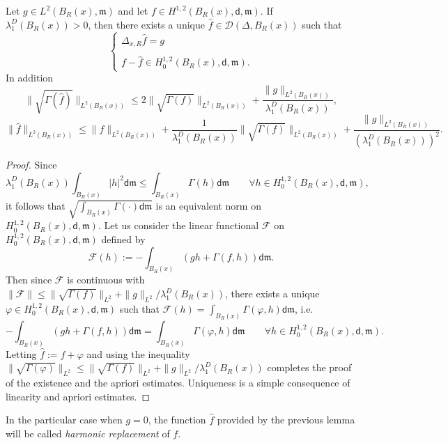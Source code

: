 \documentclass[a4paper,11pt,reqno]{article}
\numberwithin{equation}{section}
\theoremstyle{plain}
\theoremstyle{definition}
\theoremstyle{remark}
\let\altphi\phi
\let\phi\varphi
\let\varphi\altphi
\let\altphi\undefined
\newcommand{\dist}{\mathsf{d}}
\newcommand{\meas}{\mathfrak{m}}
\begin{document}
{\begin{lemma}\label{lem:existence}
Let $g \in L^2(B_R(x), \meas)$ and let $f \in H^{1, 2}(B_R(x), \dist, \meas)$.
If $\lambda_1^D(B_R(x))>0$, then there exists a unique $\hat{f} \in \mathcal{D}(\Delta, B_R(x))$ such that 
\begin{equation}
\begin{cases}
\Delta_{x,R}\hat{f}=g\\\\
f-\hat{f} \in H^{1, 2}_0(B_R(x), \dist, \meas).
\end{cases} 
\end{equation}
In addition
\begin{equation}
\label{eq:sol bound}
\|\sqrt{\Gamma(\hat{f})}\|_{L^2(B_R(x))}\leq 2\|\sqrt{\Gamma(f)}\|_{L^2(B_R(x))}+\frac{\|g\|_{L^2(B_R(x))}}{\lambda_1^D(B_R(x))},
\end{equation}
\begin{equation}\label{eq:l2 est}
\|\hat f\|_{L^2(B_R(x))}\leq \|f\|_{L^2(B_R(x))}+\frac{1}{\lambda_1^D(B_R(x))}\|\sqrt{\Gamma(f)}\|_{L^2(B_R(x))}+
\frac{\|g\|_{L^2(B_R(x))}}{(\lambda_1^D(B_R(x)))^2}.
\end{equation}
\end{lemma}
\begin{proof} Since 
$$
\lambda_1^D(B_R(x))\int_{B_R(x)}|h|^2\dist \meas \le \int_{B_R(x)}\Gamma(h)\dist \meas\qquad\forall h \in H^{1, 2}_0(B_R(x), \dist, \meas),
$$
it follows that $\sqrt{\int_{B_R(x)}\Gamma(\cdot ) \dist \meas}$ is an equivalent norm on $H^{1, 2}_0(B_R(x), \dist, \meas)$.
Let us consider the linear functional $\mathcal{F}$ on $H^{1, 2}_0(B_R(x), \dist, \meas)$ defined by
$$
\mathcal{F}(h):=-\int_{B_R(x)}(gh +\Gamma(f,h)) \dist \meas.
$$
Then since $\mathcal{F}$ is continuous with $\|\mathcal F\|\leq \|\sqrt{\Gamma(f)}\|_{L^2}+\|g\|_{L^2}/\lambda_1^D(B_R(x))$, 
there exists a unique $\phi \in H^{1, 2}_0(B_R(x), \dist, \meas)$ such that $\mathcal{F}(h)=\int_{B_R(x)}\Gamma( \phi,  h) \dist \meas$, i.e.
$$
-\int_{B_R(x)}(gh +\Gamma( f, h ))\dist \meas=\int_{B_R(x)}\Gamma( \phi,  h ) \dist \meas
\qquad \forall h \in H^{1, 2}_0(B_R(x), \dist, \meas).
$$
Letting $\hat{f}:=f+\phi$ and using the inequality $\|\sqrt{\Gamma(\phi)}\|_{L^2}\leq \|\sqrt{\Gamma(f)}\|_{L^2}+\|g\|_{L^2}/\lambda_1^D(B_R(x))$
completes the proof of the existence and the apriori estimates. Uniqueness is a simple consequence of linearity and apriori estimates.
\end{proof}

In the particular case when $g=0$, the function $\hat{f}$ provided by the previous lemma will be called
\textit{harmonic replacement} of $f$. 

}
\end{document}

